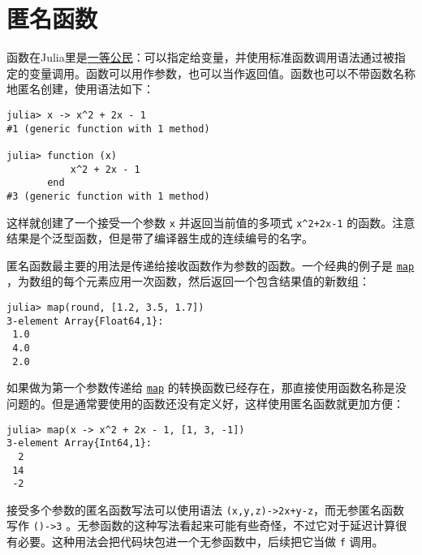 \hypertarget{8300730259363458305}{}


\section{匿名函数}



函数在Julia里是\href{https://en.wikipedia.org/wiki/First-class\_citizen}{一等公民}：可以指定给变量，并使用标准函数调用语法通过被指定的变量调用。函数可以用作参数，也可以当作返回值。函数也可以不带函数名称地匿名创建，使用语法如下：




\begin{verbatim}
julia> x -> x^2 + 2x - 1
#1 (generic function with 1 method)

julia> function (x)
           x^2 + 2x - 1
       end
#3 (generic function with 1 method)
\end{verbatim}



这样就创建了一个接受一个参数 \texttt{x} 并返回当前值的多项式 \texttt{x{\textasciicircum}2+2x-1} 的函数。注意结果是个泛型函数，但是带了编译器生成的连续编号的名字。



匿名函数最主要的用法是传递给接收函数作为参数的函数。一个经典的例子是 \hyperlink{11483231213869150535}{\texttt{map}} ，为数组的每个元素应用一次函数，然后返回一个包含结果值的新数组：




\begin{verbatim}
julia> map(round, [1.2, 3.5, 1.7])
3-element Array{Float64,1}:
 1.0
 4.0
 2.0
\end{verbatim}



如果做为第一个参数传递给 \hyperlink{11483231213869150535}{\texttt{map}} 的转换函数已经存在，那直接使用函数名称是没问题的。但是通常要使用的函数还没有定义好，这样使用匿名函数就更加方便：




\begin{verbatim}
julia> map(x -> x^2 + 2x - 1, [1, 3, -1])
3-element Array{Int64,1}:
  2
 14
 -2
\end{verbatim}



接受多个参数的匿名函数写法可以使用语法 \texttt{(x,y,z)->2x+y-z}，而无参匿名函数写作 \texttt{()->3} 。无参函数的这种写法看起来可能有些奇怪，不过它对于延迟计算很有必要。这种用法会把代码块包进一个无参函数中，后续把它当做 \texttt{f} 调用。



